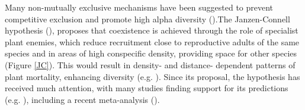 \documentclass[12pt,a4]{RDGThesis}
\begin{document}
Many non-mutually exclusive mechanisms have been suggested to prevent competitive exclusion and promote high alpha diversity (\cite{palmerVariationSpeciesRichness1994, wrightPlantDiversityTropical2002}).The Janzen-Connell hypothesis (\cite{connellRoleNaturalEnemies1971, janzenHerbivoresNumberTree1970}), proposes that coexistence is achieved through the role of specialist plant enemies, which reduce recruitment close to reproductive adults of the same species and in areas of high conspecific density, providing space for other species (Figure \ref{JC}). This would result in density- and distance- dependent patterns of plant mortality, enhancing diversity (e.g. \cite{forristerHerbivoresDriversNegative2019, bagchiPathogensInsectHerbivores2014}). Since its proposal, the hypothesis has received much attention, with many studies finding support for its predictions (e.g. \cite{harmsPervasiveDensitydependentRecruitment2000, hubbellPresenceAbsenceDensity1990, connellCompensatoryRecruitmentGrowth1984, manganNegativePlantSoil2010}), including a recent meta-analysis (\cite{comitaTestingPredictionsJanzenConnell2014}). \\
\end{document}
